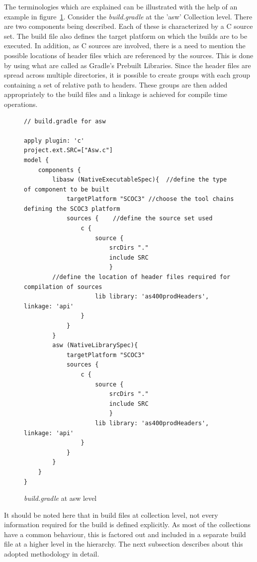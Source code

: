 \documentclass[12pt, a4paper, titlepage]{scrartcl}
\newcommand{\courierword}[1]{\textsf{\itshape #1}}{\fontfamily{pcr}\selectfont}%
\begin{document}
\par The terminologies which are explained can be illustrated with the help of an example in figure~\ref{fig:terminology-explanation}. Consider the \emph{build.gradle} at the 'asw' Collection level. There are two components being described. Each of these is characterized by a C source set. The build file also defines the target platform on which the builds are to be executed. In addition, as C sources are involved, there is a need to mention the possible locations of header files which are referenced by the sources. This is done by using what are called as Gradle's Prebuilt Libraries. Since the header files are spread across multiple directories, it is possible to create groups with each group containing a set of relative path to headers. These groups are then added appropriately to the build files and a linkage is achieved for compile time operations. 

\begin{figure}[!ht]
\begin{lstlisting}[frame=single]
// build.gradle for asw

apply plugin: 'c'
project.ext.SRC=["Asw.c"]
model {
	components {
		libasw (NativeExecutableSpec){  //define the type of component to be built
			targetPlatform "SCOC3" //choose the tool chains defining the SCOC3 platform
			sources {    //define the source set used
				c {
					source {
						srcDirs "."
						include SRC
						}
		//define the location of header files required for compilation of sources
					lib library: 'as400prodHeaders', linkage: 'api' 
				}
			}
		}
		asw (NativeLibrarySpec){ 
			targetPlatform "SCOC3"
			sources {
				c {
					source {
						srcDirs "."
						include SRC
						}
					lib library: 'as400prodHeaders', linkage: 'api'
				}				
			}
		}	
	}
}
\end{lstlisting}
\caption{\courierword{build.gradle} at asw level}
\label{fig:terminology-explanation}
\end{figure}

\par It should be noted here that in build files at collection level, not every information required for the build is defined explicitly. As most of the collections have a common behaviour, this is factored out and included in a separate build file at a higher level in the hierarchy. The next subsection describes about this adopted methodology in detail. 
\end{document}
